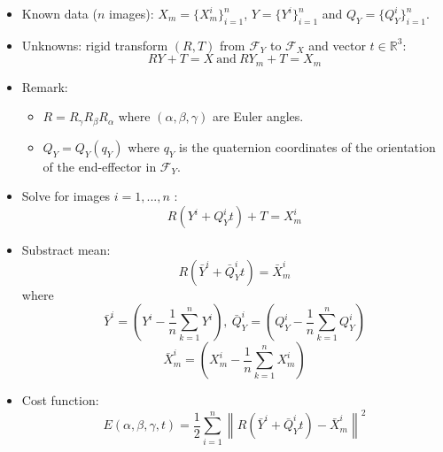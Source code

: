 \documentclass{beamer}
\begin{document}
\begin{frame}
\begin{itemize}
\item Known data ($n$ images): $X_m= \{X_m^i\}_{i=1}^n$, $Y= \{Y^i\}_{i=1}^n$ and $Q_Y= \{Q_Y^i\}_{i=1}^n$.
\item Unknowns: rigid transform $(R, T)$ from $\mathcal{F}_Y$ to $\mathcal{F}_X$ and vector $t\in \mathbb{R}^{3}$:
\begin{equation}
R Y + T = X ~ \text{and} ~ R Y_m + T = X_m
\end{equation}
\item Remark: 
\begin{itemize}
\item $R = R_{\gamma}R_{\beta}R_{\alpha}$ where $(\alpha, \beta, \gamma)$ are Euler angles.
\item $Q_Y = Q_Y(q_Y)$ where $q_Y$ is the quaternion coordinates of the orientation of the end-effector   in $\mathcal{F}_Y$.
\end{itemize}
\end{itemize}
\end{frame}

\begin{frame}
\begin{itemize}
\item Solve for images $i=1,...,n$ :
\begin{equation}
R \left( Y^i + Q_Y^i t \right) + T = X_m^i
\end{equation}
\item Substract mean:
\begin{equation}
R \left( \bar{Y}^i + \bar{Q}_Y^i t \right) = \bar{X}_m^i
\end{equation}
where
\begin{equation*}
\bar{Y}^i = \left(Y^i - \frac{1}{n}\sum_{k=1}^n Y^i \right),~\bar{Q}_Y^i = \left(Q_Y^i - \frac{1}{n}\sum_{k=1}^n Q_Y^i\right) 
\end{equation*}
\begin{equation*}
\bar{X}_m^i =\left(X_m^i - \frac{1}{n}\sum_{k=1}^n X_m^i\right)
\end{equation*}
\item Cost function:
\begin{equation}
E(\alpha, \beta, \gamma, t) = \frac{1}{2} \sum_{i=1}^n \left\| R \left( \bar{Y}^i + \bar{Q}_Y^i t \right) - \bar{X}_m^i \right\|^2
\end{equation}
\end{itemize}
\end{frame}
\end{document}
